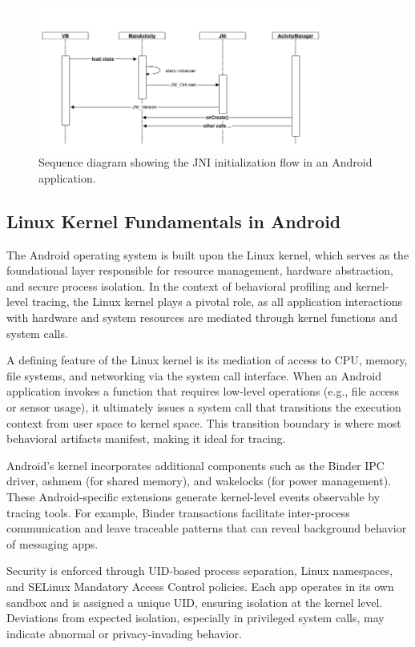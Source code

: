 \documentclass[a4paper,12pt]{report}
\begin{document}
\begin{figure}[H]
    \centering
    \includegraphics[width=0.85\textwidth]{jni_init_flow.png}
    \caption{Sequence diagram showing the JNI initialization flow in an Android application.}
    \label{fig:jni_init}
\end{figure}
\subsection{Linux Kernel Fundamentals in Android}
The Android operating system is built upon the Linux kernel, which serves as the foundational layer responsible for resource management, hardware abstraction, and secure process isolation. In the context of behavioral profiling and kernel-level tracing, the Linux kernel plays a pivotal role, as all application interactions with hardware and system resources are mediated through kernel functions and system calls.

A defining feature of the Linux kernel is its mediation of access to CPU, memory, file systems, and networking via the system call interface. When an Android application invokes a function that requires low-level operations (e.g., file access or sensor usage), it ultimately issues a system call that transitions the execution context from user space to kernel space. This transition boundary is where most behavioral artifacts manifest, making it ideal for tracing.

Android’s kernel incorporates additional components such as the Binder IPC driver, ashmem (for shared memory), and wakelocks (for power management). These Android-specific extensions generate kernel-level events observable by tracing tools. For example, Binder transactions facilitate inter-process communication and leave traceable patterns that can reveal background behavior of messaging apps.

Security is enforced through UID-based process separation, Linux namespaces, and SELinux Mandatory Access Control policies. Each app operates in its own sandbox and is assigned a unique UID, ensuring isolation at the kernel level. Deviations from expected isolation, especially in privileged system calls, may indicate abnormal or privacy-invading behavior.
\end{document}
